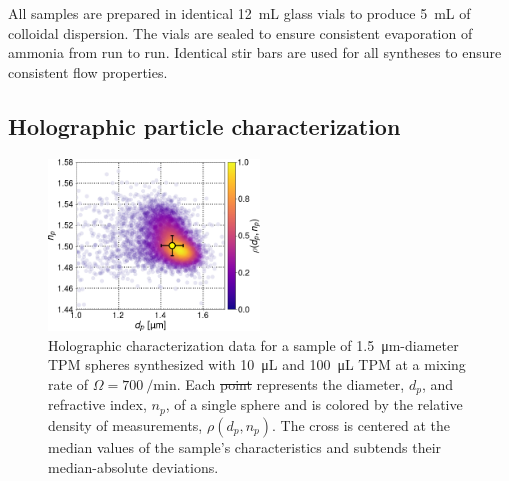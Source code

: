 \documentclass[journal=langd5,manuscript=article]{achemso}
\providecommand{\DIFadd}[1]{{\protect\color{blue}\uwave{#1}}} %
\providecommand{\DIFdel}[1]{{\protect\color{red}\sout{#1}}}                      %
\providecommand{\DIFaddFL}[1]{\DIFadd{#1}} %
\providecommand{\DIFdelFL}[1]{\DIFdel{#1}} %
\providecommand{\DIFaddbeginFL}{} %
\providecommand{\DIFaddendFL}{} %
\providecommand{\DIFdelbeginFL}{} %
\providecommand{\DIFdelendFL}{} %
\begin{document}
All samples are prepared in identical \SI{12}{\milli\liter}
glass vials to produce \SI{5}{\milli\liter} of colloidal dispersion.
The vials are sealed to ensure consistent evaporation of ammonia
from run to run.
Identical stir bars are used for all syntheses to ensure consistent
flow properties.

\subsection{Holographic particle characterization}
\label{sec:holographicparticlecharacterization}

\begin{figure}[!b]
    \centering
    \includegraphics[width=0.5\textwidth]{distribution03}
    \caption{Holographic characterization data for a sample
    of \SI{1.5}{\um}-diameter TPM spheres synthesized with
    \SI{10}{\micro\liter}  and 
    \SI{100}{\micro\liter} TPM at a mixing rate
    of $\Omega = \SI{700}{\per\minute}$.  Each 
    \DIFdelbeginFL \DIFdelFL{point
    }\DIFdelendFL \DIFaddbeginFL \DIFaddFL{of the \num{6935} points
    }\DIFaddendFL represents the diameter, $d_p$, and refractive index,
    $n_p$, of a single sphere and is colored by the relative
    density of measurements, $\rho(d_p, n_p)$.
    The cross is centered at the median values of the sample's
    characteristics and subtends their 
    median-absolute deviations.}
    \label{fig:typicalcharacterization}
\end{figure}
\end{document}
